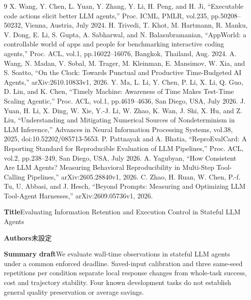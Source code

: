 \documentclass[uplatex,a4paper,twocolumn,10pt]{jsarticle}
\begin{document}
\begin{thebibliography}{9}
 X. Wang, Y. Chen, L. Yuan, Y. Zhang, Y. Li, H. Peng, and H. Ji, ``Executable code actions elicit better LLM agents,'' Proc. ICML, PMLR, vol.235, pp.50208--50232, Vienna, Austria, July 2024.
 H. Trivedi, T. Khot, M. Hartmann, R. Manku, V. Dong, E. Li, S. Gupta, A. Sabharwal, and N. Balasubramanian, ``AppWorld: a controllable world of apps and people for benchmarking interactive coding agents,'' Proc. ACL, vol.1, pp.16022--16076, Bangkok, Thailand, Aug. 2024.
 A. Wang, N. Madan, V. Sobal, M. Trager, M. Kleinman, E. Mansimov, W. Xia, and S. Soatto, ``On the Clock: Towards Punctual and Productive Time-Budgeted AI Agents,'' arXiv:2610.10833v1, 2026.
 Y. Ma, L. Li, Y. Chen, P. Li, X. Li, Q. Guo, D. Lin, and K. Chen, ``Timely Machine: Awareness of Time Makes Test-Time Scaling Agentic,'' Proc. ACL, vol.1, pp.4619--4636, San Diego, USA, July 2026.
 J. Yuan, H. Li, X. Ding, W. Xie, Y.-J. Li, W. Zhao, K. Wan, J. Shi, X. Hu, and Z. Liu, ``Understanding and Mitigating Numerical Sources of Nondeterminism in LLM Inference,'' Advances in Neural Information Processing Systems, vol.38, 2025, doi:10.52202/085713-5653.
 P. Pattnayak and A. Bhatia, ``ReproEvalCard: A Reporting Standard for Reproducible Evaluation of LLM Pipelines,'' Proc. ACL, vol.2, pp.238--249, San Diego, USA, July 2026.
 A. Yagubyan, ``How Consistent Are LLM Agents? Measuring Behavioral Reproducibility in Multi-Step Tool-Calling Pipelines,'' arXiv:2605.28840v1, 2026.
 C. Zhao, H. Ruan, W. Chen, P.-f. Tu, U. Abbasi, and J. Hesch, ``Beyond Prompts: Measuring and Optimizing LLM Tool-Agent Harnesses,'' arXiv:2609.05736v1, 2026.
\end{thebibliography}
\clearpage
\onecolumn
\noindent\textbf{Title}\quad Evaluating Information Retention and Execution Control in Stateful LLM Agents

\noindent\textbf{Authors}\quad 未設定

\noindent\textbf{Summary draft}\quad We evaluate wall-time observations in stateful LLM agents under a common enforced deadline. Saved-input calibration and three same-seed repetitions per condition separate local response changes from whole-task success, cost and trajectory stability. Four known development tasks do not establish general quality preservation or average savings.
\end{document}
